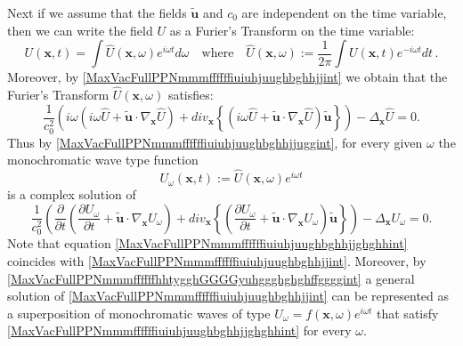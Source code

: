 \documentclass{article}
\theoremstyle{definition}
\theoremstyle{remark}
\renewcommand{\vec}[1]{\mathbf{#1}}
\newcommand{\er}{\eqref}
\newcommand{\er}{\eqref}
\begin{document}
Next if we assume that the fields $\vec {\tilde u}$ and $c_0$ are
independent on the time variable, then we can write the field $U$ as
a Furier's Transform on the time variable:
\begin{equation}\label{MaxVacFullPPNmmmffffffhhtygghGGGGyuhggghghghffggggint}
U(\vec x,t)=\int \hat U(\vec x,\omega)e^{i\omega
t}d\omega\quad\text{where}\quad\hat U(\vec
x,\omega):=\frac{1}{2\pi}\int U(\vec x,t)e^{-i\omega t}dt\,.
\end{equation}
Moreover, by \er{MaxVacFullPPNmmmffffffiuiuhjuughbghhjjint} we
obtain that the Furier's Transform $\hat U(\vec x,\omega)$
satisfies:
\begin{equation}\label{MaxVacFullPPNmmmffffffiuiuhjuughbghhjjuggint}
\frac{1}{c^2_0}\left(i\omega\left(i\omega \hat U+\vec {\tilde
u}\cdot\nabla_{\vec x}\hat U\right)+div_{\vec x}
\left\{\left(i\omega \hat U+\vec {\tilde u}\cdot\nabla_{\vec x} \hat
U\right)\vec {\tilde u}\right\}\right)-\Delta_{\vec x}\hat U=0.
\end{equation}
Thus by \er{MaxVacFullPPNmmmffffffiuiuhjuughbghhjjuggint}, for every
given $\omega$ the monochromatic wave type function
\begin{equation}\label{MaxVacFullPPNmmmffffffhhtygghGGGGyuhggghghghffgggguiuint}
U_\omega(\vec x,t):=\hat U(\vec x,\omega)e^{i\omega t}
\end{equation}
is a complex solution of
\begin{equation}\label{MaxVacFullPPNmmmffffffiuiuhjuughbghhjjghghhint}
\frac{1}{c^2_0}\left(\frac{\partial}{\partial t}\left(\frac{\partial
U_\omega}{\partial t}+\vec {\tilde u}\cdot\nabla_{\vec
x}U_\omega\right)+div_{\vec x} \left\{\left(\frac{\partial
U_\omega}{\partial t}+\vec {\tilde u}\cdot\nabla_{\vec x}
U_\omega\right)\vec {\tilde u}\right\}\right)-\Delta_{\vec
x}U_\omega=0.
\end{equation}
Note that equation
\er{MaxVacFullPPNmmmffffffiuiuhjuughbghhjjghghhint} coincides with
\er{MaxVacFullPPNmmmffffffiuiuhjuughbghhjjint}. Moreover, by
\er{MaxVacFullPPNmmmffffffhhtygghGGGGyuhggghghghffggggint} a general
solution of \er{MaxVacFullPPNmmmffffffiuiuhjuughbghhjjint} can be
represented as a superposition of monochromatic waves of type
$U_\omega=f(\vec x,\omega)e^{i\omega t}$ that satisfy
\er{MaxVacFullPPNmmmffffffiuiuhjuughbghhjjghghhint} for every
$\omega$.
\end{document}
